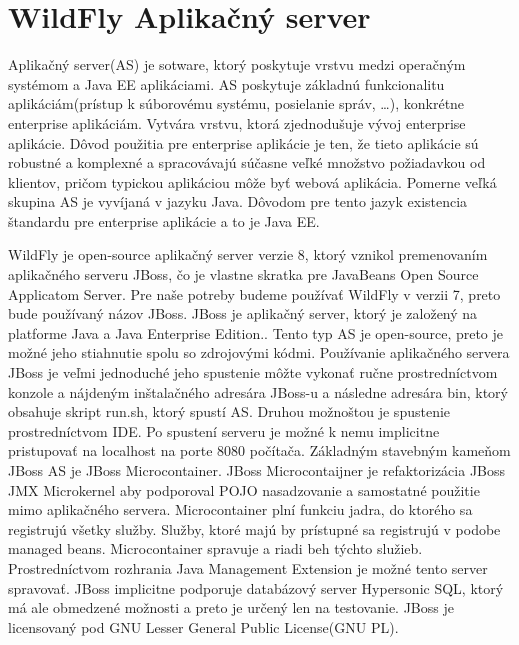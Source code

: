 \section{WildFly Aplikačný server}\label{jbossc}
Aplikačný server(AS) je sotware, ktorý poskytuje vrstvu medzi operačným systémom a Java EE aplikáciami. AS poskytuje základnú funkcionalitu aplikáciám(prístup k súborovému systému, posielanie správ, \ldots), konkrétne enterprise aplikáciám. Vytvára vrstvu, ktorá zjednodušuje vývoj enterprise aplikácie. Dôvod použitia pre enterprise aplikácie je ten, že tieto aplikácie sú robustné a komplexné a spracovávajú súčasne veľké množstvo požiadavkou od klientov, pričom typickou aplikáciou môže byť webová aplikácia. Pomerne veľká skupina AS je vyvíjaná v jazyku Java. Dôvodom pre tento jazyk existencia štandardu pre enterprise aplikácie a to je Java EE.

WildFly je open-source aplikačný server verzie 8, ktorý vznikol premenovaním aplikačného serveru JBoss, čo je vlastne skratka pre JavaBeans Open Source Applicatom Server. Pre naše potreby budeme používať WildFly v verzii 7, preto bude používaný názov JBoss. JBoss je aplikačný server, ktorý je založený na platforme Java a Java Enterprise Edition.\cite{jbossbook}. Tento typ AS je open-source, preto je možné jeho stiahnutie spolu so zdrojovými kódmi. Používanie aplikačného servera JBoss je veľmi jednoduché jeho spustenie môžte vykonať ručne prostredníctvom konzole a nájdeným inštalačného adresára JBoss-u a následne adresára bin, ktorý obsahuje skript run.sh, ktorý spustí AS. Druhou možnoštou je spustenie prostredníctvom IDE. Po spustení serveru je možné k nemu implicitne pristupovať na localhost na porte 8080 počítača. Základným stavebným kameňom JBoss AS je JBoss Microcontainer. JBoss Microcontaijner je refaktorizácia JBoss JMX Microkernel aby podporoval POJO nasadzovanie a samostatné použitie mimo aplikačného servera. Microcontainer plní funkciu jadra, do ktorého sa registrujú všetky služby. Služby, ktoré majú by prístupné sa registrujú v podobe managed beans. Microcontainer spravuje a riadi beh týchto služieb. Prostredníctvom rozhrania Java Management Extension je možné tento server spravovať. JBoss implicitne podporuje databázový server Hypersonic SQL, ktorý má ale obmedzené možnosti a preto je určený len na testovanie. JBoss je licensovaný pod GNU Lesser General Public License(GNU PL).


